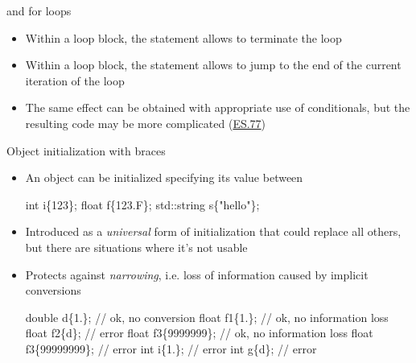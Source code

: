 \begin{frame}[fragile]{ and  for loops}

  \begin{itemize}
  \item<1-> Within a loop block, the  statement allows to terminate
    the loop
  \item<2-> Within a loop block, the  statement allows to jump to
    the end of the current iteration of the loop
  \item<3> The same effect can be obtained with appropriate use of conditionals,
    but the resulting code may be more complicated (\href{https://isocpp.github.io/CppCoreGuidelines/CppCoreGuidelines#es77-minimize-the-use-of-break-and-continue-in-loops}{ES.77})
  \end{itemize}
\end{frame}

\begin{frame}[fragile]{Object initialization with braces}

  \begin{itemize}
  \item An object can be initialized specifying its value between \code{\{\}}

    \begin{codeblock}
int i\{123\};
float f\{123.F\};
std::string s\{"hello"\};\end{codeblock}

  \item Introduced as a \textit{universal} form of initialization that could
    replace all others, but there are situations where it's not usable

  \item Protects against \textit{narrowing}, i.e. loss of information caused by
    implicit conversions

    \begin{codeblock}
double d\{1.\};         // ok, no conversion
float f1\{1.\};         // ok, no information loss
float f2\{d\};          // error
float f3\{9\textquotesingle{}999\textquotesingle{}999\};  // ok, no information loss
float f3\{99\textquotesingle{}999\textquotesingle{}999\}; // error
int i\{1.\};            // error
int g\{d\};             // error\end{codeblock}
  \end{itemize}
\end{frame}

